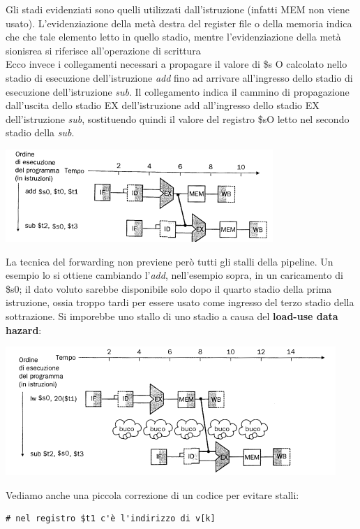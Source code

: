 \documentclass[a4paper,12pt, oneside]{book}
\begin{document}
\begin{enumerate}
\begin{itemize}
  \end{itemize}
  Gli stadi evidenziati sono quelli utilizzati dall'istruzione (infatti MEM non viene usato). L'evidenziazione della metà destra del register file o
  della memoria indica che che tale elemento letto in quello stadio, mentre l'evidenziazione della metà sionisrea si riferisce all'operazione di scrittura
  \\
  Ecco invece i collegamenti necessari a propagare il valore di \$s O calcolato nello stadio di esecuzione dell'istruzione \textit{add} fino ad arrivare all'ingresso
  dello stadio di esecuzione dell'istruzione \textit{sub}. Il collegamento indica il cammino
  di propagazione dall'uscita dello stadio EX dell'istruzione add all'ingresso dello stadio EX dell'istruzione \textit{sub}, sostituendo quindi il valore del registro \$sO letto nel secondo stadio della \textit{sub}.
  \begin{center}
    \includegraphics[scale = 0.7]{img/pro2.png}
  \end{center}
  La tecnica del forwarding non previene però tutti gli stalli della pipeline. Un esempio lo si ottiene cambiando l'\textit{add}, nell'esempio sopra, in un caricamento di \$s0; il dato voluto sarebbe
  disponibile solo dopo il quarto stadio della prima istruzione, ossia troppo tardi per
  essere usato come ingresso del terzo stadio della sottrazione. Si imporebbe uno stallo di uno stadio a causa del \textbf{load-use data hazard}:
  \begin{center}
    \includegraphics[scale = 0.7]{img/pro3.png}
  \end{center}
  Vediamo anche una piccola correzione di un codice per evitare stalli:
\begin{verbatim}
# nel registro $t1 c'è l'indirizzo di v[k]


\end{verbatim}
\end{enumerate}
\end{document}
